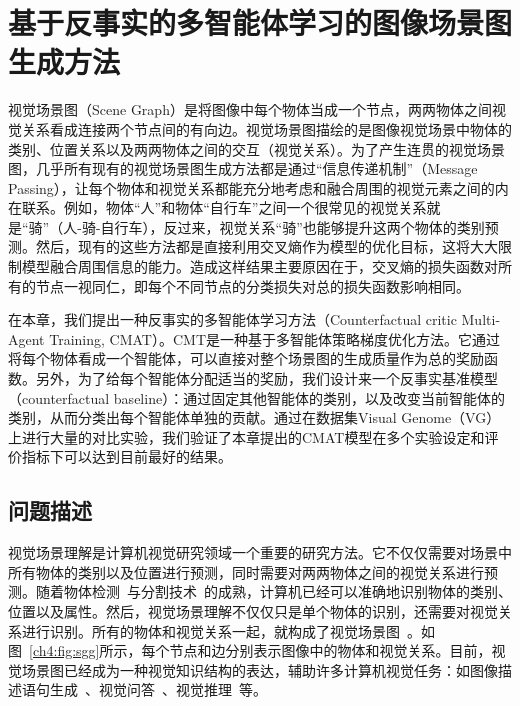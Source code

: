 \chapter{基于反事实的多智能体学习的图像场景图生成方法}

视觉场景图（Scene Graph）是将图像中每个物体当成一个节点，两两物体之间视觉关系看成连接两个节点间的有向边。视觉场景图描绘的是图像视觉场景中物体的类别、位置关系以及两两物体之间的交互（视觉关系）。为了产生连贯的视觉场景图，几乎所有现有的视觉场景图生成方法都是通过“信息传递机制”（Message Passing），让每个物体和视觉关系都能充分地考虑和融合周围的视觉元素之间的内在联系。例如，物体“人”和物体“自行车”之间一个很常见的视觉关系就是“骑”（人-骑-自行车），反过来，视觉关系“骑”也能够提升这两个物体的类别预测。然后，现有的这些方法都是直接利用交叉熵作为模型的优化目标，这将大大限制模型融合周围信息的能力。造成这样结果主要原因在于，交叉熵的损失函数对所有的节点一视同仁，即每个不同节点的分类损失对总的损失函数影响相同。

在本章，我们提出一种反事实的多智能体学习方法（Counterfactual critic Multi-Agent Training, CMAT）。CMT是一种基于多智能体策略梯度优化方法。它通过将每个物体看成一个智能体，可以直接对整个场景图的生成质量作为总的奖励函数。另外，为了给每个智能体分配适当的奖励，我们设计来一个反事实基准模型（counterfactual baseline）：通过固定其他智能体的类别，以及改变当前智能体的类别，从而分类出每个智能体单独的贡献。通过在数据集Visual Genome（VG）上进行大量的对比实验，我们验证了本章提出的CMAT模型在多个实验设定和评价指标下可以达到目前最好的结果。


\section{问题描述}

视觉场景理解是计算机视觉研究领域一个重要的研究方法。它不仅仅需要对场景中所有物体的类别以及位置进行预测，同时需要对两两物体之间的视觉关系进行预测。随着物体检测~\cite{ren2015faster,liu2016ssd}与分割技术~\cite{long2015fully,he2017mask}的成熟，计算机已经可以准确地识别物体的类别、位置以及属性。然后，视觉场景理解不仅仅只是单个物体的识别，还需要对视觉关系进行识别。所有的物体和视觉关系一起，就构成了视觉场景图~\cite{johnson2015image}。如图~\ref{ch4:fig:sgg}所示，每个节点和边分别表示图像中的物体和视觉关系。目前，视觉场景图已经成为一种视觉知识结构的表达，辅助许多计算机视觉任务：如图像描述语句生成~\cite{yao2018exploring,yang2019auto,kim2019dense}、视觉问答~\cite{norcliffe2018learning,hudson2019gqa}、视觉推理~\cite{shi2019explainable,haurilet2019s}等。


